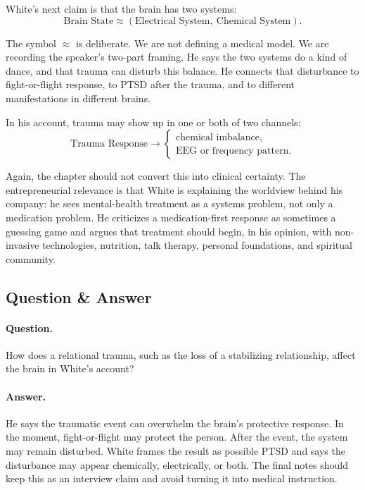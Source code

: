 White's next claim is that the brain has two systems:
\begin{equation}
\text{Brain State}\approx
(\text{Electrical System},\ \text{Chemical System}).
\end{equation}

The symbol \(\approx\) is deliberate. We are not defining a medical model. We are recording the speaker's two-part framing. He says the two systems do a kind of dance, and that trauma can disturb this balance. He connects that disturbance to fight-or-flight response, to PTSD after the trauma, and to different manifestations in different brains.

In his account, trauma may show up in one or both of two channels:
\begin{equation}
\text{Trauma Response}
\longrightarrow
\begin{cases}
\text{chemical imbalance},\\
\text{EEG or frequency pattern}.
\end{cases}
\end{equation}

Again, the chapter should not convert this into clinical certainty. The entrepreneurial relevance is that White is explaining the worldview behind his company: he sees mental-health treatment as a systems problem, not only a medication problem. He criticizes a medication-first response as sometimes a guessing game and argues that treatment should begin, in his opinion, with non-invasive technologies, nutrition, talk therapy, personal foundations, and spiritual community.

\subsection{Question \& Answer}

\paragraph{Question.}
How does a relational trauma, such as the loss of a stabilizing relationship, affect the brain in White's account?

\paragraph{Answer.}
He says the traumatic event can overwhelm the brain's protective response. In the moment, fight-or-flight may protect the person. After the event, the system may remain disturbed. White frames the result as possible PTSD and says the disturbance may appear chemically, electrically, or both. The final notes should keep this as an interview claim and avoid turning it into medical instruction.


